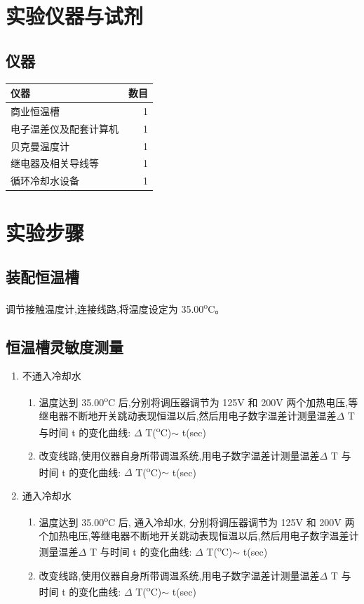 \documentclass[11pt]{report}
\begin{document}
\chapter{实验仪器与试剂}
\label{sec:orge2afea6}
\section{仪器}
\label{sec:orgada4166}
\begin{center}
\begin{tabular}{lr}
仪器 & 数目\\
\hline
商业恒温槽 & 1\\
电子温差仪及配套计算机 & 1\\
贝克曼温度计 & 1\\
继电器及相关导线等 & 1\\
循环冷却水设备 & 1\\
\end{tabular}
\end{center}


\chapter{实验步骤}
\label{sec:org2292a41}
\section{装配恒温槽}
\label{sec:orgeb21e7c}
调节接触温度计,连接线路,将温度设定为 35.00\textsuperscript{o}C。
\section{恒温槽灵敏度测量}
\label{sec:orgf78fd09}
\begin{enumerate}
\item 不通入冷却水
\label{sec:org61a0231}
\begin{enumerate}
\item 温度达到 35.00\textsuperscript{o}C 后,分别将调压器调节为 125V 和 200V 两个加热电压,等继电器不断地开关跳动表现恒温以后,然后用电子数字温差计测量温差\(\Delta\) T 与时间 t 的变化曲线: \(\Delta\) T(\textsuperscript{o}C)\(\sim\) t(sec)

\item 改变线路,使用仪器自身所带调温系统,用电子数字温差计测量温差\(\Delta\) T 与时间 t 的变化曲线: \(\Delta\) T(\textsuperscript{o}C)\(\sim\) t(sec)
\end{enumerate}
\item 通入冷却水
\label{sec:org3860e39}
\begin{enumerate}
\item 温度达到 35.00\textsuperscript{o}C 后, 通入冷却水, 分别将调压器调节为 125V 和 200V 两个加热电压,等继电器不断地开关跳动表现恒温以后,然后用电子数字温差计测量温差\(\Delta\) T 与时间 t 的变化曲线: \(\Delta\) T(\textsuperscript{o}C)\(\sim\) t(sec)

\item 改变线路,使用仪器自身所带调温系统,用电子数字温差计测量温差\(\Delta\) T 与时间 t 的变化曲线: \(\Delta\) T(\textsuperscript{o}C)\(\sim\) t(sec)
\end{enumerate}
\end{enumerate}
\end{document}
